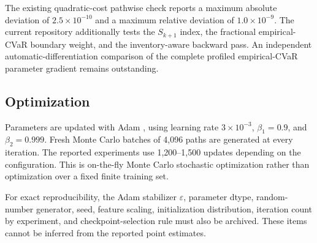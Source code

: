 The existing quadratic-cost pathwise check reports a maximum absolute deviation
of $2.5\times10^{-10}$ and a maximum relative deviation of
$1.0\times10^{-9}$. The current repository additionally tests the $S_{k+1}$ index, the
fractional empirical-CVaR boundary weight, and the inventory-aware backward
pass. An independent automatic-differentiation comparison of the complete
profiled empirical-CVaR parameter gradient remains outstanding.

\subsection{Optimization}

Parameters are updated with Adam \citep{kingma2015}, using learning rate
$3\times10^{-3}$, $\beta_1=0.9$, and $\beta_2=0.999$. Fresh Monte Carlo
batches of 4,096 paths are generated at every iteration. The reported
experiments use 1,200--1,500 updates depending on the configuration. This is
on-the-fly Monte Carlo stochastic optimization rather than optimization over a
fixed finite training set.

For exact reproducibility, the Adam stabilizer $\varepsilon$, parameter dtype,
random-number generator, seed, feature scaling, initialization distribution,
iteration count by experiment, and checkpoint-selection rule must also be
archived. These items cannot be inferred from the reported point estimates.

